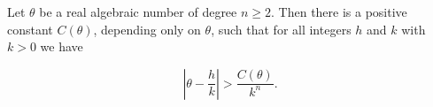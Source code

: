 Let $\theta$ be a real algebraic number of degree $n \geq 2$. Then there is a positive constant $C(\theta)$, depending only on $\theta$, such that for all integers $h$ and $k$ with $k > 0$ we have

$$\left| \theta - \frac{h}{k} \right| > \frac{C(\theta)}{k^n}.$$
